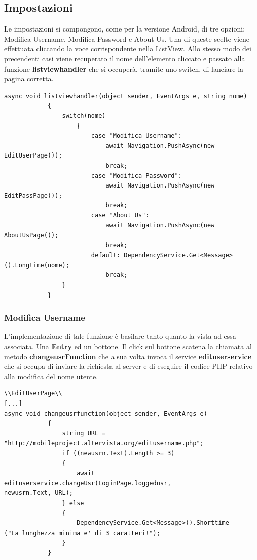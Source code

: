\documentclass[a4paper, 50pt, twoside]{article}
\begin{document}
\subsection{Impostazioni}
Le impostazioni si compongono, come per la versione Android, di tre opzioni: Modifica Username, Modifica Password e About Us. Una di queste scelte viene effettuata cliccando la voce corrispondente nella ListView. Allo stesso modo dei precendenti casi viene recuperato il nome dell'elemento cliccato e passato alla funzione \textbf{listviewhandler} che si occuperà, tramite uno switch, di lanciare la pagina corretta.
\begin{lstlisting}
async void listviewhandler(object sender, EventArgs e, string nome)
            {
                switch(nome)
                    {
                        case "Modifica Username":
                            await Navigation.PushAsync(new EditUserPage());
                            break;
                        case "Modifica Password":
                            await Navigation.PushAsync(new EditPassPage());
                            break;
                        case "About Us":
                            await Navigation.PushAsync(new AboutUsPage());
                            break;
                        default: DependencyService.Get<Message>().Longtime(nome);
                            break;
                }
            }
\end{lstlisting}
\subsubsection{Modifica Username}
L'implementazione di tale funzione è basilare tanto quanto la vista ad essa associata. Una \textbf{Entry} ed un bottone. Il click sul bottone scatena la chiamata al metodo \textbf{changeusrFunction} che a sua volta invoca il service \textbf{edituserservice} che si occupa di inviare la richiesta al server e di eseguire il codice PHP relativo alla modifica del nome utente.
\begin{lstlisting}
\\EditUserPage\\
[...]
async void changeusrfunction(object sender, EventArgs e)
            {
                string URL = 
"http://mobileproject.altervista.org/editusername.php";
                if ((newusrn.Text).Length >= 3)
                {
                    await edituserservice.changeUsr(LoginPage.loggedusr, 
newusrn.Text, URL);
                } else
                {
                    DependencyService.Get<Message>().Shorttime
("La lunghezza minima e' di 3 caratteri!");
                }
            }
\end{lstlisting} 
\end{document}
